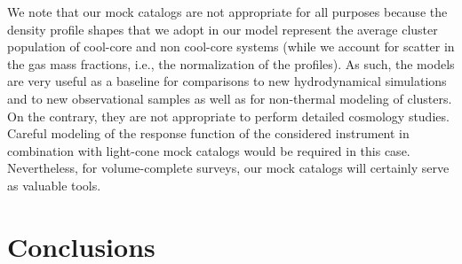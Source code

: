 \documentclass[useAMS,usenatbib]{mn2e}
\begin{document}
{We note that our mock catalogs are not appropriate for all purposes because the
density profile shapes that we adopt in our model represent the average cluster
population of cool-core and non cool-core systems (while we account for scatter
in the gas mass fractions, i.e., the normalization of the profiles). As such,
the models are very useful as a baseline for comparisons to new hydrodynamical
simulations and to new observational samples as well as for non-thermal modeling
of clusters. On the contrary, they are not appropriate to perform detailed
cosmology studies. Careful modeling of the response function of the considered
instrument in combination with light-cone mock catalogs would be required in
this case. Nevertheless, for volume-complete surveys, our mock catalogs will
certainly serve as valuable tools.  }


\section{Conclusions}
\label{sec:7}
\end{document}

